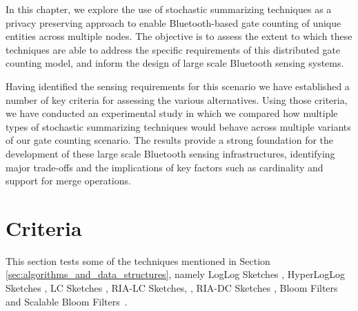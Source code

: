In this chapter, we explore the use of stochastic summarizing
techniques as a privacy preserving approach to enable Bluetooth-based
gate counting of unique entities across multiple nodes. The objective
is to assess the extent to which these techniques are able to address the
specific requirements of this distributed gate counting model, and
inform the design of large scale Bluetooth sensing systems.

Having identified the sensing requirements for this scenario we have
established a number of key criteria for assessing the various
alternatives. Using those criteria, we have conducted an
experimental study in which we compared how multiple types of
stochastic summarizing techniques would behave across multiple
variants of our gate counting scenario. The results provide a strong
foundation for the development of these large scale Bluetooth sensing
infrastructures, identifying major trade-offs and the implications of
key factors such as cardinality and support for merge operations.




\section{Criteria}
\label{sec:Criteria}

This section tests some of the techniques mentioned in Section
\ref{sec:algorithms_and_data_structures}, namely LogLog Sketches
\cite{Durand:2003tc}, HyperLogLog Sketches \cite{Fusy:2007um}, LC
Sketches \cite{Whang:1990uh}, RIA-LC Sketches,
\cite{Fan:2008wl,YaoChungFanArbeeLPChen:2010to}, RIA-DC Sketches
\cite{YaoChungFanArbeeLPChen:2010to}, Bloom Filters~\cite{Bloom1970}
and Scalable Bloom Filters~\cite{Almeida2007}.

